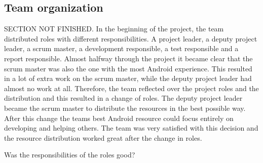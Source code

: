 \subsection{Team organization}
SECTION NOT FINISHED.
In the beginning of the project, the team distributed roles with different responsibilities. A project leader, a deputy project leader, a scrum master, a development responsible, a test responsible and a report responsible. Almost halfway through the project it became clear that the scrum master was also the one with the most Android experience. This resulted in a lot of extra work on the scrum master, while the deputy project leader had almost no work at all. Therefore, the team reflected over the project roles and the distribution and this resulted in a change of roles. The deputy project leader became the scrum master to distribute the resources in the best possible way. After this change the teams best Android resource could focus entirely on developing and helping others. The team was very satisfied with this decision and the resource distribution worked great after the change in roles. 

Was the responsibilities of the roles good?

